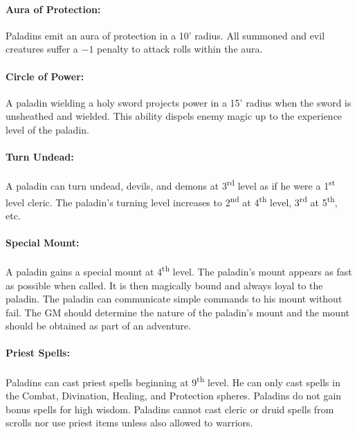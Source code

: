 \begin{multicols}{2}
\paragraph{Aura of Protection:} Paladins emit an aura of protection in a 10' radius.  All summoned and evil creatures suffer a $-1$ penalty to attack rolls within the aura.

\paragraph{Circle of Power:} A paladin wielding a holy sword projects power in a 15' radius when the sword is unsheathed and wielded.  This ability dispels enemy magic up to the experience level of the paladin.

\paragraph{Turn Undead:} A paladin can turn undead, devils, and demons at 3\textsuperscript{rd} level as if he were a 1\textsuperscript{st} level cleric.  The paladin's turning level increases to 2\textsuperscript{nd} at 4\textsuperscript{th} level, 3\textsuperscript{rd} at 5\textsuperscript{th}, etc.

\paragraph{Special Mount:} A paladin gains a special mount at 4\textsuperscript{th} level.  The paladin's mount appears as fast as possible when called.  It is then magically bound and always loyal to the paladin.  The paladin can communicate simple commands to his mount without fail.  The GM should determine the nature of the paladin's mount and the mount should be obtained as part of an adventure.

\paragraph{Priest Spells:} Paladins can cast priest spells beginning at 9\textsuperscript{th} level.  He can only cast spells in the Combat, Divination, Healing, and Protection spheres.  Paladins do not gain bonus spells for high wisdom.  Paladins cannot cast cleric or druid spells from scrolls nor use priest items unless also allowed to warriors.


\end{multicols}
